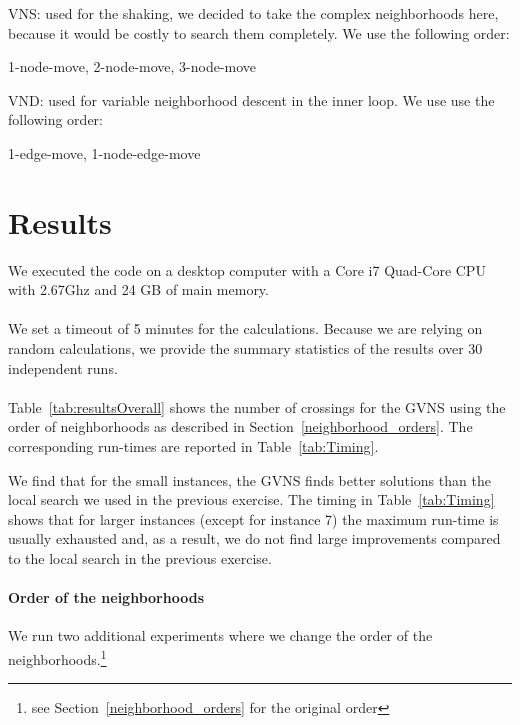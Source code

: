 \documentclass{scrartcl}
\begin{document}
\begin{description}

    \item{VNS}: used for the shaking, we decided to take the complex
      neighborhoods here, because it would be costly to search them
      completely. We use the following order:
                
                1-node-move, 2-node-move, 3-node-move
                
    \item{VND}: used for variable neighborhood descent in the inner loop. We use use the following order:
         
                1-edge-move, 1-node-edge-move

\end{description}


\section{Results}

We executed the code on a desktop computer with a Core i7 Quad-Core
CPU with 2.67Ghz and 24 GB of main memory. 

\paragraph{}
We set a timeout of 5 minutes for the calculations.  Because we
are relying on random calculations, we provide the summary statistics
of the results over 30 independent runs.


\paragraph{}
Table~\ref{tab:resultsOverall} shows the number of crossings for the
GVNS using the order of neighborhoods as described in Section~\ref{neighborhood_orders}.
The corresponding run-times are reported in Table~\ref{tab:Timing}.

We find that for the small instances, the GVNS finds better solutions
than the local search we used in the previous exercise. The timing in
Table~\ref{tab:Timing} shows that for larger instances (except for
instance 7) the maximum run-time is usually exhausted and, as a
result, we do not find large improvements compared to the local search
in the previous exercise.

\paragraph{Order of the neighborhoods}
We run two additional experiments where we change the order of the
neighborhoods.\footnote{see Section~\ref{neighborhood_orders} for the
  original order}
\end{document}
